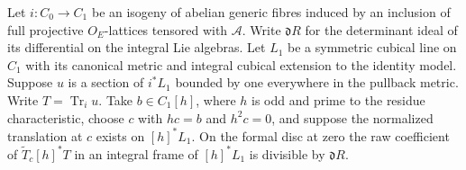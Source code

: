\begin{lemma}\label{intjet:disc}
Let \(i:C_0\to C_1\) be an isogeny of abelian generic fibres induced
by an inclusion of full projective \(O_E\)-lattices tensored with
\(\mathcal A\). Write \(\mathfrak d R\) for the determinant ideal
of its differential on the integral Lie algebras. Let \(L_1\)
be a symmetric cubical line on \(C_1\) with its canonical metric
and integral cubical extension to the identity model. Suppose
\(u\) is a section of \(i^*L_1\) bounded by one everywhere
in the pullback metric. Write \(T=\operatorname{Tr}_i u\).
Take \(b\in C_1[h]\), where \(h\) is odd and prime to the residue
characteristic, choose \(c\) with \(hc=b\) and \(h^2c=0\),
and suppose the normalized translation at \(c\) exists on
\([h]^*L_1\). On the formal disc at zero the raw coefficient of
\(\widetilde T_c[h]^*T\) in an integral frame of \([h]^*L_1\)
is divisible by \(\mathfrak d R\).
\end{lemma}
